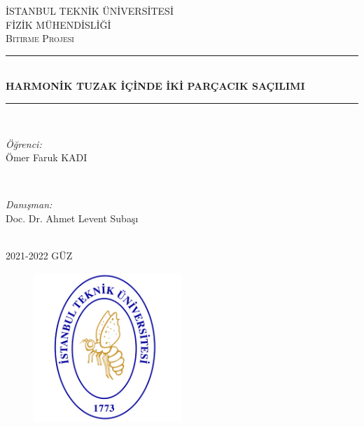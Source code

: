 \documentclass[12pt, a4paper]{article}
\newcommand{\HRule}{\rule{\linewidth}{0.8mm}}
\begin{document}
\begin{titlepage}


\centering

\textsc{\LARGE İSTANBUL TEKNİK ÜNİVERSİTESİ}\\[0.5cm]%
\textsc{\LARGE FİZİK MÜHENDİSLİĞİ}\\[1.5cm]
\textsc{\large Bitirme Projesi}\\[0.5cm]%

\HRule \\[0.4cm]
{ \huge \bfseries HARMONİK TUZAK İÇİNDE İKİ PARÇACIK SAÇILIMI} %
\HRule \\[1.5cm]

\begin{minipage}{0.4\textwidth}
\begin{flushleft} \large
\emph{Öğrenci:}\\
Ömer Faruk KADI %
\end{flushleft}
\end{minipage}
~
\begin{minipage}{0.4\textwidth}
\begin{flushright} \large
\emph{Danışman:} \\
Doc. Dr. Ahmet Levent Subaşı %
\end{flushright}
\end{minipage}\\[2cm]

{\large 2021-2022 GÜZ}\\[2cm] 

\begin{figure}[ht!]
    \centering
    \shorthandoff{=}
    \includegraphics[width=0.5\textwidth]{itu-logo1.jpg}
\end{figure}

\vfill %
\end{titlepage}
\end{document}
